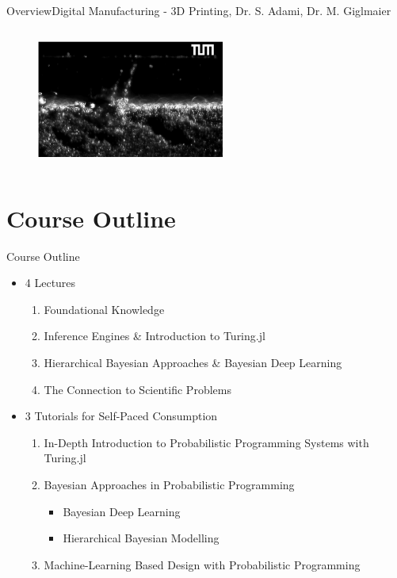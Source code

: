 \documentclass[AERbeamer%
              ,optEnglish%
              ,optBiber%
              ,optBibstyleAlphabetic%
              ,optBeamerClassicFormat%
              ]{AERlatex}%
\begin{document}
\begin{frame}[c]{Overview}{Digital Manufacturing - 3D Printing, Dr. S. Adami, Dr. M. Giglmaier}
\begin{columns}[T]
\begin{column}{0.48\textwidth}
\begin{itemize}
            \end{itemize}
            \begin{figure}
                \centering
                \includegraphics[width=0.55\textwidth]{3DPrinting2.png}
            \end{figure}
        \end{column}
    \end{columns}
\end{frame}



\section{Course Outline}

\begin{frame}[c]{Course Outline}
    \centering
    \begin{itemize}
        \item 4 Lectures
        \begin{enumerate}
            \item Foundational Knowledge
            \item Inference Engines \& Introduction to Turing.jl
            \item Hierarchical Bayesian Approaches \& Bayesian Deep Learning
            \item The Connection to Scientific Problems
        \end{enumerate}
        \item 3 Tutorials for Self-Paced Consumption
        \begin{enumerate}
            \item In-Depth Introduction to Probabilistic Programming Systems with Turing.jl
            \item Bayesian Approaches in Probabilistic Programming
            \begin{itemize}
                \item Bayesian Deep Learning
                \item Hierarchical Bayesian Modelling
            \end{itemize}
            \item Machine-Learning Based Design with Probabilistic Programming
        \end{enumerate}
    \end{itemize}
\end{frame}
\end{document}
